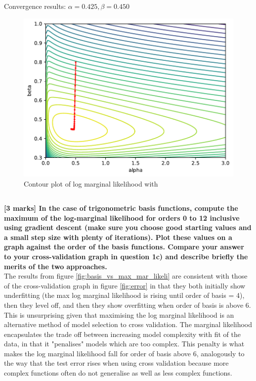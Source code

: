 \documentclass[12pt,twoside]{article}
\begin{document}
Convergence results: $\alpha = 0.425, \beta = 0.450$

\begin{figure}[h]
\centering %
\includegraphics[width = 0.9\hsize] {./figures/log_marginal_likelihood.pdf}
\caption{Contour plot of log marginal likelihood with }%
\label{fig:log_marginal_likelihood}
\end{figure}



\subsection{}
\textbf{[3 marks] In the case of trigonometric basis functions, compute the maximum of the log-marginal likelihood for orders 0 to 12 inclusive using gradient descent (make sure you choose good starting values and a small step size with plenty of iterations). Plot these values on a graph against the order of the basis functions. Compare your answer to your cross-validation graph in question 1c) and describe briefly the merits of the two approaches.}\\

The results from figure \ref{fig:basis_vs_max_mar_likeli} are consistent with those of the cross-validation graph in figure \ref{fig:error} in that they both initially show underfitting (the max log marginal likelihood is rising until order of basis = 4), then they level off, and then they show overfitting when order of basis is above 6. This is unsurprising given that maximising the log marginal likelihood is an alternative method of model selection to cross validation. The marginal likelihood encapsulates the trade off between increasing model complexity with fit of the data, in that it "penalises" models which are too complex. This penalty is what makes the log marginal likelihood fall for order of basis above 6, analogously to the way that the test error rises when using cross validation because more complex functions often do not generalise as well as less complex functions.
\end{document}
